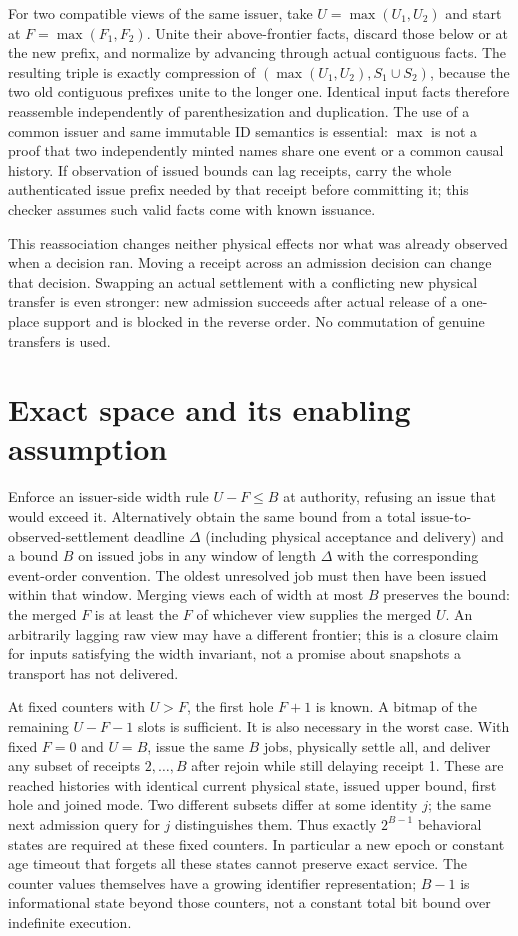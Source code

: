 \documentclass[11pt]{article}
\begin{document}
For two compatible views of the same issuer, take $U=\max(U_1,U_2)$ and start at $F=\max(F_1,F_2)$. Unite their above-frontier facts, discard those below or at the new prefix, and normalize by advancing through actual contiguous facts. The resulting triple is exactly compression of $(\max(U_1,U_2),S_1\cup S_2)$, because the two old contiguous prefixes unite to the longer one. Identical input facts therefore reassemble independently of parenthesization and duplication. The use of a common issuer and same immutable ID semantics is essential: $\max$ is not a proof that two independently minted names share one event or a common causal history. If observation of issued bounds can lag receipts, carry the whole authenticated issue prefix needed by that receipt before committing it; this checker assumes such valid facts come with known issuance.

This reassociation changes neither physical effects nor what was already observed when a decision ran. Moving a receipt across an admission decision can change that decision. Swapping an actual settlement with a conflicting new physical transfer is even stronger: new admission succeeds after actual release of a one-place support and is blocked in the reverse order. No commutation of genuine transfers is used.

\section{Exact space and its enabling assumption}
Enforce an issuer-side width rule $U-F\le B$ at authority, refusing an issue that would exceed it. Alternatively obtain the same bound from a total issue-to-observed-settlement deadline $\Delta$ (including physical acceptance and delivery) and a bound $B$ on issued jobs in any window of length $\Delta$ with the corresponding event-order convention. The oldest unresolved job must then have been issued within that window. Merging views each of width at most $B$ preserves the bound: the merged $F$ is at least the $F$ of whichever view supplies the merged $U$. An arbitrarily lagging raw view may have a different frontier; this is a closure claim for inputs satisfying the width invariant, not a promise about snapshots a transport has not delivered.

At fixed counters with $U>F$, the first hole $F+1$ is known. A bitmap of the remaining $U-F-1$ slots is sufficient. It is also necessary in the worst case. With fixed $F=0$ and $U=B$, issue the same $B$ jobs, physically settle all, and deliver any subset of receipts $2,\dots,B$ after rejoin while still delaying receipt 1. These are reached histories with identical current physical state, issued upper bound, first hole and joined mode. Two different subsets differ at some identity $j$; the same next admission query for $j$ distinguishes them. Thus exactly $2^{B-1}$ behavioral states are required at these fixed counters. In particular a new epoch or constant age timeout that forgets all these states cannot preserve exact service. The counter values themselves have a growing identifier representation; $B-1$ is informational state beyond those counters, not a constant total bit bound over indefinite execution.
\end{document}
